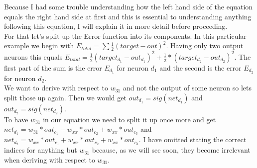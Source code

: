 \documentclass[11pt, halfparskip]{article}
\begin{document}
\noindent Because I had some trouble understanding how the left hand side of the equation equals the right hand side at first and this is essential to understanding anything following this
equation, I will explain it in more detail before proceeding.\\
For that let's split up the Error function into its components. In this particular example we begin with $E_{total} = \sum \frac{1}{2}(target-out)^2$. Having only two output neurons
this equals $E_{total} = \frac{1}{2}(target_{d_1} - out_{d_1})^2 + \frac{1}{2}*(target_{d_2} - out_{d_2})^2$.
The first part of the sum is the error $E_{d_1}$ for neuron $d_1$ and the second is the error $E_{d_2}$ for neuron $d_2$.\\
We want to derive with respect to $w_{31}$ and not the output of some neuron so lets split those up again. Then we would get $out_{d_1} = sig(net_{d_1})$ and 
$out_{d_2} = sig(net_{d_2})$.\\
To have $w_{31}$ in our equation we need to split it up once more and get $net_{d_1} = w_{31}*out_{c_1} + w_{xx}*out_{c_2} + w_{xx}*out_{c_3}$ and
$net_{d_2} = w_{xx}*out_{c_1} + w_{xx}*out_{c_2} + w_{xx}*out_{c_3}$. I have omitted stating the correct indices for anything but $w_{31}$ because, as we will see soon,
they become irrelevant when deriving with respect to $w_{31}$.\\
\end{document}
